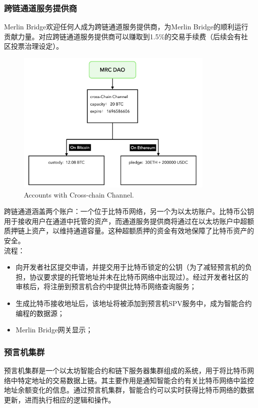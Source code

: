 \documentclass{article}
\begin{document}
\subsubsection{跨链通道服务提供商}
\par Merlin Bridge欢迎任何人成为跨链通道服务提供商，为Merlin Bridge的顺利运行贡献力量。对应跨链通道服务提供商可以赚取到1.5\%的交易手续费（后续会有社区投票治理设定）。
\begin{figure}[h]
\centering
\includegraphics[width=0.85\textwidth]{services.png}
\caption{\label{fig:services}Accounts with Cross-chain Channel.}
\end{figure}
\par 跨链通道涵盖两个账户：一个位于比特币网络，另一个为以太坊账户。比特币公钥用于接收用户在通道中托管的资产，而通道服务提供商将通过在以太坊账户中超额质押链上资产，以维持通道容量。这种超额质押的资金有效地保障了比特币资产的安全。\\
流程：
\begin{itemize}
    \item 向开发者社区提交申请，并提交用于比特币锁定的公钥（为了减轻预言机的负担，协议要求提的托管地址并未在比特币网络中出现过）。经过开发者社区的审核后，将注册到预言机合约中提供比特币网络查询服务；
    \item 生成比特币接收地址后，该地址将被添加到预言机SPV服务中，成为智能合约编程的数据源；
    \item Merlin Bridge网关显示；
\end{itemize}
\subsubsection{预言机集群}
\par 预言机集群是一个以太坊智能合约和链下服务器集群组成的系统，用于将比特币网络中特定地址的交易数据上链。其主要作用是通知智能合约有关比特币网络中监控地址余额变化的信息。通过预言机集群，智能合约可以实时获得比特币网络的数据更新，进而执行相应的逻辑和操作。
\end{document}
